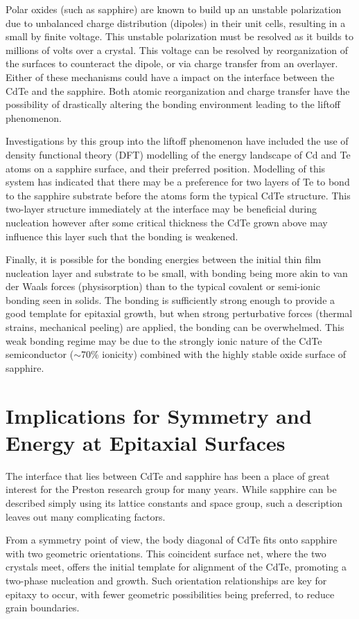 Polar oxides (such as sapphire) are known to build up an unstable polarization due to unbalanced charge distribution (dipoles) in their unit cells, resulting in a small by finite voltage.
This unstable polarization must be resolved as it builds to millions of volts over a crystal.
This voltage can be resolved by reorganization of the surfaces to counteract the dipole, or via charge transfer from an overlayer.
Either of these mechanisms could have a impact on the interface between the CdTe and the sapphire.
Both atomic reorganization and charge transfer have the possibility of drastically altering the bonding environment leading to the liftoff phenomenon.

Investigations by this group into the liftoff phenomenon have included the use of density functional theory (DFT) modelling of the energy landscape of Cd and Te atoms on a sapphire surface, and their preferred position.
Modelling of this system has indicated that there may be a preference for two layers of Te to bond to the sapphire substrate before the atoms form the typical CdTe structure.
This two-layer structure immediately at the interface may be beneficial during nucleation however after some critical thickness the CdTe grown above may influence this layer such that the bonding is weakened.

Finally, it is possible for the bonding energies between the initial thin film nucleation layer and substrate to be small, with bonding being more akin to van der Waals forces (physisorption) than to the typical covalent or semi-ionic bonding seen in solids.
The bonding is sufficiently strong enough to provide a good template for epitaxial growth, but when strong perturbative forces (thermal strains, mechanical peeling) are applied, the bonding can be overwhelmed.
This weak bonding regime may be due to the strongly ionic nature of the CdTe semiconductor (\(\sim\)70\% ionicity) combined with the highly stable oxide surface of sapphire.
\section{Implications for Symmetry and Energy at Epitaxial Surfaces}
The interface that lies between CdTe and sapphire has been a place of great interest for the Preston research group for many years.
While sapphire can be described simply using its lattice constants and space group, such a description leaves out many complicating factors.

From a symmetry point of view, the body diagonal of CdTe fits onto sapphire with two geometric orientations.
This coincident surface net, where the two crystals meet, offers the initial template for alignment of the CdTe, promoting a two-phase nucleation and growth.
Such orientation relationships are key for epitaxy to occur, with fewer geometric possibilities being preferred, to reduce grain boundaries.

